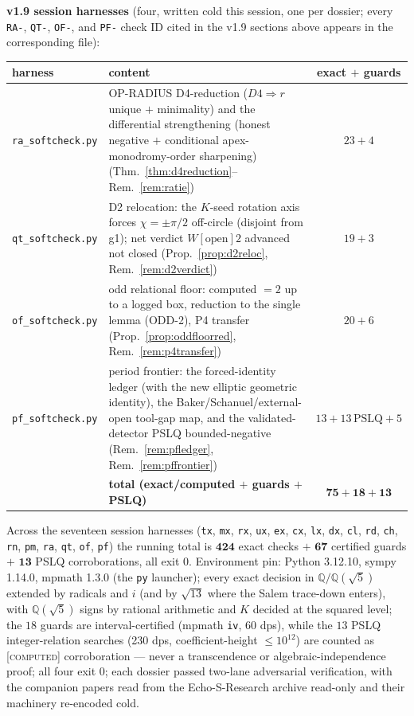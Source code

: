 \documentclass[11pt]{article}
\newcommand{\tagC}{\textcolor{cC}{\textsc{[computed]}}}
\newcommand{\hx}[1]{\textcolor{cC}{\footnotesize\texttt{#1}}}
\newcommand{\Q}{\mathbb{Q}}
\theoremstyle{plain}
\theoremstyle{definition}
\theoremstyle{remark}
\begin{document}
\smallskip\noindent
\textbf{v1.9 session harnesses} (four, written cold this session, one per
dossier; every \hx{RA-}, \hx{QT-}, \hx{OF-}, and \hx{PF-} check ID cited in the
v1.9 sections above appears in the corresponding file):
\begin{center}\footnotesize\setlength{\tabcolsep}{4pt}
\begin{tabular}{@{}lp{10.7cm}c@{}}
\toprule
harness & content & exact $+$ guards\\
\midrule
\texttt{ra\_softcheck.py} & OP-RADIUS D4-reduction ($D4\Rightarrow r$ unique $+$ minimality) and the differential strengthening (honest negative $+$ conditional apex-monodromy-order sharpening) (Thm.~\ref{thm:d4reduction}--Rem.~\ref{rem:ratie}) & $23+4$\\
\texttt{qt\_softcheck.py} & D2 relocation: the $K$-seed rotation axis forces $\chi=\pm\pi/2$ off-circle (disjoint from g1); net verdict $W[\text{open}]2$ advanced not closed (Prop.~\ref{prop:d2reloc}, Rem.~\ref{rem:d2verdict}) & $19+3$\\
\texttt{of\_softcheck.py} & odd relational floor: computed $=2$ up to a logged box, reduction to the single lemma (ODD-2), P4 transfer (Prop.~\ref{prop:oddfloorred}, Rem.~\ref{rem:p4transfer}) & $20+6$\\
\texttt{pf\_softcheck.py} & period frontier: the forced-identity ledger (with the new elliptic geometric identity), the Baker/Schanuel/external-open tool-gap map, and the validated-detector PSLQ bounded-negative (Rem.~\ref{rem:pfledger}, Rem.~\ref{rem:pffrontier}) & $13+13\,\mathrm{PSLQ}+5$\\
\midrule
 & \textbf{total (exact/computed $+$ guards $+$ PSLQ)} & $\mathbf{75+18+13}$\\
\bottomrule
\end{tabular}
\end{center}
Across the seventeen session harnesses (\texttt{tx}, \texttt{mx}, \texttt{rx},
\texttt{ux}, \texttt{ex}, \texttt{cx}, \texttt{lx}, \texttt{dx}, \texttt{cl},
\texttt{rd}, \texttt{ch}, \texttt{rn}, \texttt{pm}, \texttt{ra}, \texttt{qt},
\texttt{of}, \texttt{pf}) the running total is $\mathbf{424}$ exact checks $+$
$\mathbf{67}$ certified guards $+$ $\mathbf{13}$ PSLQ corroborations, all exit 0.
Environment pin: Python 3.12.10, sympy 1.14.0, mpmath 1.3.0 (the \texttt{py}
launcher); every exact decision in $\Q/\Q(\sqrt5)$ extended by radicals and $i$
(and by $\sqrt{13}$ where the Salem trace-down enters), with $\Q(\sqrt5)$ signs
by rational arithmetic and $K$ decided at the squared level; the $18$ guards are
interval-certified (mpmath \texttt{iv}, 60 dps), while the $13$ PSLQ
integer-relation searches (230 dps, coefficient-height $\le10^{12}$) are counted
as \tagC{} corroboration --- never a transcendence or algebraic-independence
proof; all four exit 0; each dossier passed two-lane adversarial verification,
with the companion papers read from the Echo-S-Research archive read-only and
their machinery re-encoded cold.
\end{document}
